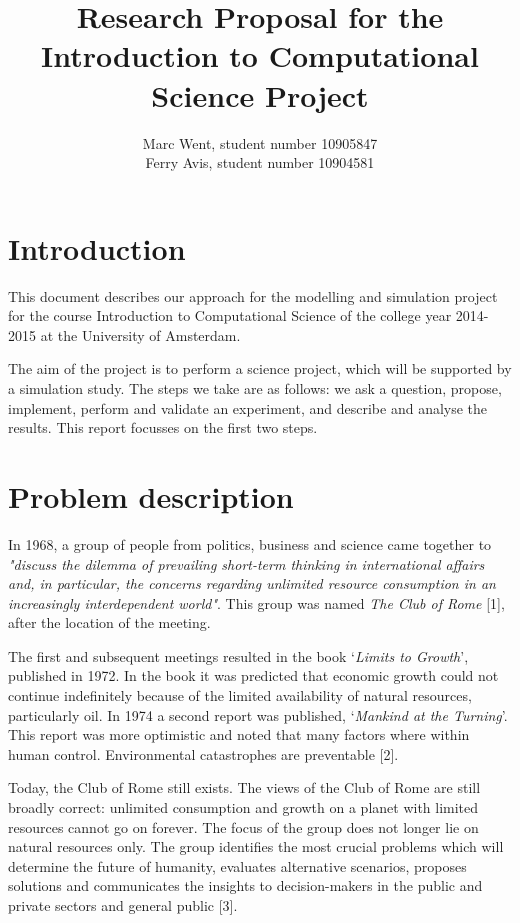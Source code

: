 \documentclass[10pt,a4paper]{article}
\title{Research Proposal for the Introduction to Computational Science Project}
\author{Marc Went, student number 10905847\\Ferry Avis, student number 10904581}
\begin{document}
\maketitle

\section*{Introduction}

This document describes our approach for the modelling and simulation project for the course Introduction to Computational Science of the college year 2014-2015 at the University of Amsterdam.

The aim of the project is to perform a science project, which will be supported by a simulation study. The steps we take are as follows: we ask a question, propose, implement, perform and validate an experiment, and describe and analyse the results. This report focusses on the first two steps. 

\section*{Problem description}

In 1968, a group of people from politics, business and science came together to \emph{"discuss the dilemma of prevailing short-term thinking in international affairs and, in particular, the concerns regarding unlimited resource consumption in an increasingly interdependent world"}. This group was named \emph{The Club of Rome} [1], after the location of the meeting.

The first and subsequent meetings resulted in the book `\emph{Limits to Growth}', published in 1972. In the book it was predicted that economic growth could not continue indefinitely because of the limited availability of natural resources, particularly oil. In 1974 a second report was published, `\emph{Mankind at the Turning}'. This report was more optimistic and noted that many factors where within human control. Environmental catastrophes are preventable [2].

Today, the Club of Rome still exists. The views of the Club of Rome are still broadly correct: unlimited consumption and growth on a planet with limited resources cannot go on forever. The focus of the group does not longer lie on natural resources only. The group identifies the most crucial problems which will determine the future of humanity, evaluates alternative scenarios, proposes solutions and communicates the insights to decision-makers in the public and private sectors and general public [3].
\end{document}
